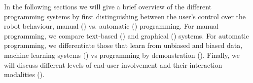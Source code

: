 In the following sections we will give a brief overview of the different programming systems by first distinguishing between the user's control over the robot behaviour, \ie manual () vs. automatic () programming.
For manual programming, we compare text-based () and graphical () systems.
For automatic programming, we differentiate those that learn from unbiased and biased data, \ie machine learning systems () vs programming by demonstration ().
Finally, we will discuss different levels of end-user involvement and their interaction modalities ().



